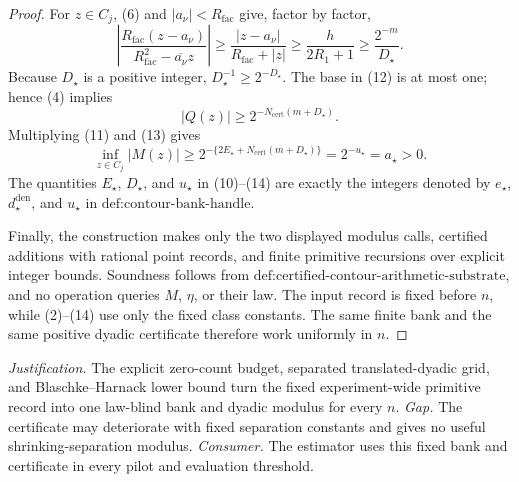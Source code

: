 \documentclass{article}
\begin{document}
\begin{proof}
For \(z\in C_j\), (6) and \(|a_\nu|<R_{\mathrm{fac}}\) give, factor by
factor,
\[
 \left|
 \frac{R_{\mathrm{fac}}(z-a_\nu)}
      {R_{\mathrm{fac}}^2-\overline{a_\nu}z}
 \right|
 \ge \frac{|z-a_\nu|}{R_{\mathrm{fac}}+|z|}
 \ge \frac{h}{2R_1+1}
 \ge \frac{2^{-m}}{D_{\star}}.                                 \tag{12}
\]
Because \(D_{\star}\) is a positive integer,
\(D_{\star}^{-1}\ge2^{-D_{\star}}\).  The base in (12) is at most one;
hence (4) implies
\[
 |Q(z)|
 \ge2^{-N_{\mathrm{cert}}(m+D_{\star})}.                         \tag{13}
\]
Multiplying (11) and (13) gives
\[
 \inf_{z\in C_j}|M(z)|
 \ge2^{-\{2E_{\star}+N_{\mathrm{cert}}(m+D_{\star})\}}
 =2^{-u_{\star}}=a_{\star}>0.                                  \tag{14}
\]
The quantities \(E_{\star}\), \(D_{\star}\), and \(u_{\star}\) in
(10)--(14) are exactly the integers denoted by
\(e_{\star}\), \(d_{\star}^{\mathrm{den}}\), and \(u_{\star}\) in
\(\text{def:contour-bank-handle}\).

Finally, the construction makes only the two displayed modulus calls,
certified additions with rational point records, and finite primitive
recursions over explicit integer bounds.  Soundness follows from
\(\text{def:certified-contour-arithmetic-substrate}\), and no operation
queries \(M\), \(\eta\), or their law.  The input record is fixed before
\(n\), while (2)--(14) use only the fixed class constants.  The same finite
bank and the same positive dyadic certificate therefore work uniformly in
\(n\).
\end{proof}
\par\smallskip\noindent \textit{Justification.} The explicit zero-count budget, separated translated-dyadic grid, and Blaschke--Harnack lower bound turn the fixed experiment-wide primitive record into one law-blind bank and dyadic modulus for every \(n\). \textit{Gap.} The certificate may deteriorate with fixed separation constants and gives no useful shrinking-separation modulus. \textit{Consumer.} The estimator uses this fixed bank and certificate in every pilot and evaluation threshold.
\end{document}
